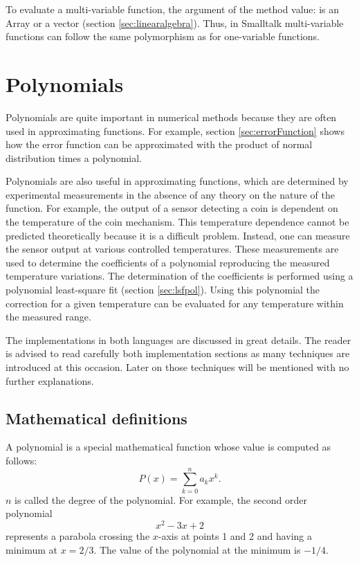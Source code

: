 \documentclass[twoside]{book}
\begin{document}
To evaluate a multi-variable function, the argument of the method
value: is an Array or a vector (\cf section
\ref{sec:linearalgebra}). Thus, in Smalltalk multi-variable
functions can follow the same polymorphism as for one-variable
functions.

\section{Polynomials}
\label{sec:polynomial}
 Polynomials are quite important in
numerical methods because they are often used in approximating
functions. For example, section \ref{sec:errorFunction} shows how
the error function can be approximated with the product of normal
distribution times a polynomial.

Polynomials are also useful in approximating functions, which are
determined by experimental measurements in the absence of any
theory on the nature of the function. For example, the output of a
sensor detecting a coin is dependent on the temperature of the
coin mechanism. This temperature dependence cannot be predicted
theoretically because it is a difficult problem. Instead, one can
measure the sensor output at various controlled temperatures.
These measurements are used to determine the coefficients of a
polynomial reproducing the measured temperature variations. The
determination of the coefficients is performed using a polynomial
least-square fit (\cf section \ref{sec:lsfpol}). Using this
polynomial the correction for a given temperature can be evaluated
for any temperature within the measured range.

The implementations in both languages are discussed in great
details. The reader is advised to read carefully both
implementation sections as many techniques are introduced at this
occasion. Later on those techniques will be mentioned with no
further explanations.

\subsection{Mathematical definitions}
\label{sec:polymath} A polynomial is a special mathematical
function whose value is computed as follows:
\begin{equation}
\label{eq:polynomialDef}P\left(x\right)=\sum_{k=0}^{n}a_k x^k.
\end{equation}
$n$ is called the degree of the polynomial. For example, the
second order polynomial
\begin{equation}
\label{eq:polynomialExample} x^2 -3x + 2
\end{equation}
represents a parabola crossing the $x$-axis at points 1 and 2 and
having a minimum at $x= 2/3$. The value of the polynomial at the
minimum is $-1/4$.
\end{document}
